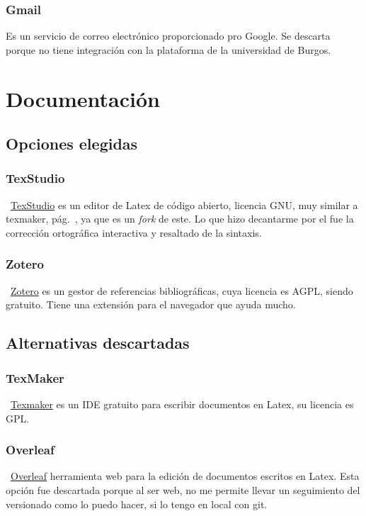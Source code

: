 \subsubsection{Gmail}
Es un servicio de correo electrónico proporcionado pro Google. Se descarta porque no tiene integración con la plataforma de la universidad de Burgos.

\section{Documentación}

\subsection{Opciones elegidas}

\subsubsection{TexStudio}
~\href{https://www.texstudio.org/}{TexStudio} es un editor de Latex de código abierto, licencia GNU, muy similar a texmaker, pág.~\pageref{textmaker}, ya que es un \emph{fork} de este. Lo que hizo decantarme por el fue la corrección ortográfica interactiva y resaltado de la sintaxis.

\subsubsection{Zotero}
~\href{https://www.zotero.org/}{Zotero} es un gestor de referencias bibliográficas, cuya licencia es AGPL, siendo gratuito. Tiene una extensión para el navegador que ayuda mucho.

\subsection{Alternativas descartadas}

\subsubsection{TexMaker}\label{textmaker}
~\href{https://www.xm1math.net/texmaker/}{Texmaker} es un IDE gratuito para escribir documentos en Latex, su licencia es GPL.

\subsubsection{Overleaf}
~\href{https://www.overleaf.com/}{Overleaf} herramienta web para la edición de documentos escritos en Latex. Esta opción fue descartada porque al ser web, no me permite llevar un seguimiento del versionado como lo puedo hacer, si lo tengo en local con git.

